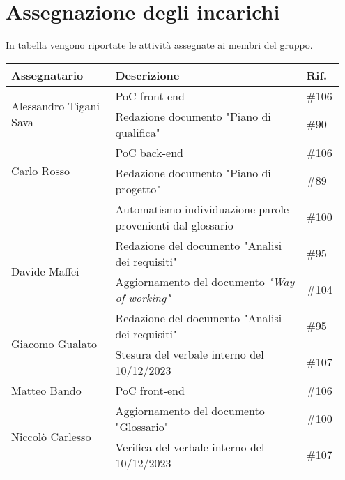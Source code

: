 \section{Assegnazione degli incarichi}
In tabella vengono riportate le attività assegnate ai membri del gruppo.
\begin{center}
	{
		\renewcommand{\arraystretch}{1.5}
		\begin{tabular}{p{0.30\linewidth}|p{0.55\linewidth}|p{0.10\linewidth}}
			\textbf{Assegnatario}             	& \textbf{Descrizione}                                  & \textbf{Rif.} \\
			\hline
			\multirow{2}{*}{Alessandro Tigani Sava}	& PoC front-end                                         & \#106         \\
			\cline{2-3}
				& Redazione documento "Piano di qualifica"	& \#90 	\\
			\hline
			\multirow{2}{*}{Carlo Rosso}		& PoC back-end                                          & \#106         \\
			\cline{2-3}
				& Redazione documento "Piano di progetto"	& \#89 	\\
			\cline{2-3}
				& Automatismo individuazione parole provenienti dal glossario	& \#100 	\\
			\hline
			\multirow{2}{*}{Davide Maffei}    	& Redazione del documento "Analisi dei requisiti"        & \#95          \\
			\cline{2-3}
			                                  	& Aggiornamento del documento \textit{"Way of working"}  & \#104         \\
			\hline
			\multirow{2}{*}{Giacomo Gualato}  	& Redazione del documento "Analisi dei requisiti"        & \#95          \\
			\cline{2-3}
			                                  	& Stesura del verbale interno del 10/12/2023             & \#107         \\
			\hline
			Matteo Bando     					& PoC front-end                                          & \#106         \\
			\hline
			\multirow{2}{*}{Niccolò Carlesso} 	& Aggiornamento del documento "Glossario"                & \#100         \\
			\cline{2-3}
			                                  	& Verifica del verbale interno del 10/12/2023            & \#107         \\
			\hline
		\end{tabular}
	}
\end{center}
